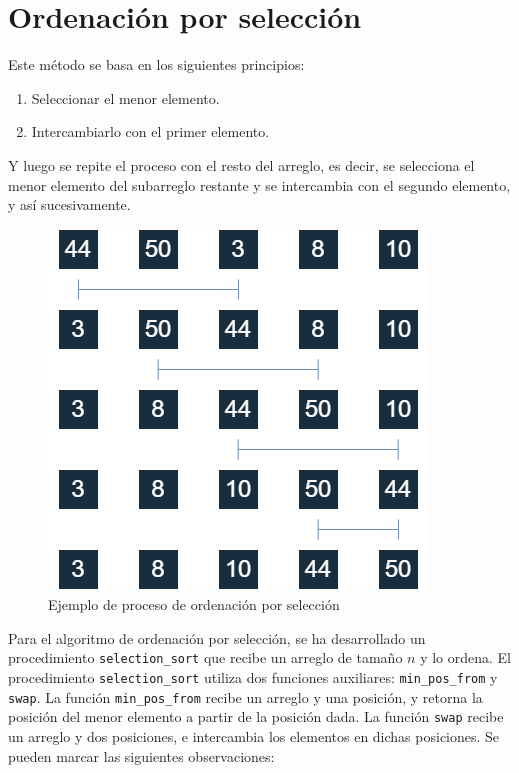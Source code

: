 \section{Ordenación por selección}
Este método se basa en los siguientes principios:
\begin{enumerate}
    \item Seleccionar el menor elemento.
    \item Intercambiarlo con el primer elemento.
\end{enumerate}
Y luego se repite el proceso con el resto del arreglo, es decir, se selecciona el menor elemento del subarreglo restante y se intercambia con el segundo elemento, y así sucesivamente.
\newpage
\begin{figure}[h]
\centering
\includegraphics[scale=0.5]{./estáticos/ordSeleccion.png}
\caption{Ejemplo de proceso de ordenación por selección}
\end{figure}

Para el algoritmo de ordenación por selección, se ha desarrollado un procedimiento \texttt{selection\_sort} que recibe un arreglo de tamaño $n$ y lo ordena. El procedimiento \texttt{selection\_sort} utiliza dos funciones auxiliares: \texttt{min\_pos\_from} y \texttt{swap}. La función \texttt{min\_pos\_from} recibe un arreglo y una posición, y retorna la posición del menor elemento a partir de la posición dada. La función \texttt{swap} recibe un arreglo y dos posiciones, e intercambia los elementos en dichas posiciones. Se pueden marcar las siguientes observaciones:


